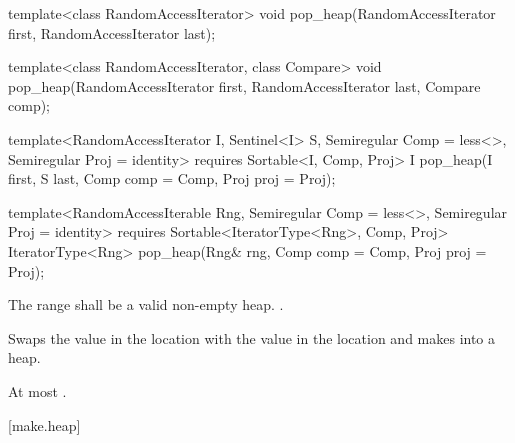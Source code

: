 %
\begin{removedblock}
\begin{itemdecl}
template<class RandomAccessIterator>
  void pop_heap(RandomAccessIterator first, RandomAccessIterator last);

template<class RandomAccessIterator, class Compare>
  void pop_heap(RandomAccessIterator first, RandomAccessIterator last,
                Compare comp);
\end{itemdecl}
\end{removedblock}
\begin{addedblock}
\begin{itemdecl}
template<RandomAccessIterator I, Sentinel<I> S, Semiregular Comp = less<>,
    Semiregular Proj = identity>
  requires Sortable<I, Comp, Proj>
  I pop_heap(I first, S last, Comp comp = Comp{}, Proj proj = Proj{});

template<RandomAccessIterable Rng, Semiregular Comp = less<>, Semiregular Proj = identity>
  requires Sortable<IteratorType<Rng>, Comp, Proj>
  IteratorType<Rng>
    pop_heap(Rng& rng, Comp comp = Comp{}, Proj proj = Proj{});
\end{itemdecl}
\end{addedblock}

\begin{itemdescr}
\pnum
\requires
The range
shall be a valid non-empty heap.
.

\pnum
\effects
Swaps the value in the location 
with the value in the location
and makes
into a heap.

\begin{addedblock}
\pnum
\returns {}
\end{addedblock}

\pnum
\complexity
At most
.
\end{itemdescr}

[make.heap]{}


